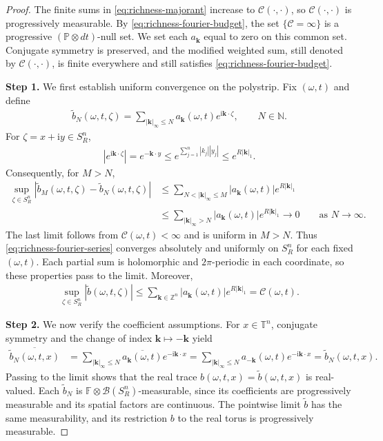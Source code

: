 \documentclass[print,wide]{draft}
\begin{document}
\begin{proof}
The finite sums in \eqref{eq:richness-majorant} increase to \(\mathcal C(\cdot,\cdot)\), so \(\mathcal C(\cdot,\cdot)\) is progressively measurable. By \eqref{eq:richness-fourier-budget}, the set \(\{\mathcal C=\infty\}\) is a progressive \((\mathbb P\otimes dt)\)-null set. We set each \(a_{\mathbf k}\) equal to zero on this common set. Conjugate symmetry is preserved, and the modified weighted sum, still denoted by \(\mathcal C(\cdot,\cdot)\), is finite everywhere and still satisfies \eqref{eq:richness-fourier-budget}.

\textbf{Step 1.} We first establish uniform convergence on the polystrip. Fix \((\omega,t)\) and define
\begin{align*}
\widetilde b_N(\omega,t,\zeta)
=\sum_{|\mathbf k|_\infty\le N}a_{\mathbf k}(\omega,t)e^{\mathrm{i}\mathbf k\cdot \zeta},
\qquad N\in\mathbb N.
\end{align*}
For \(\zeta=x+\mathrm{i}y\in S_R^n\),
\begin{align*}
|e^{\mathrm{i}\mathbf k\cdot \zeta}|
=e^{-\mathbf k\cdot y}
\le e^{\sum_{j=1}^n|k_j||y_j|}
\le e^{R|\mathbf k|_1}.
\end{align*}
Consequently, for \(M>N\),
\begin{align*}
\sup_{\zeta\in S_R^n}
|\widetilde b_M(\omega,t,\zeta)-\widetilde b_N(\omega,t,\zeta)|
&\le\sum_{N<|\mathbf k|_\infty\le M}
|a_{\mathbf k}(\omega,t)|e^{R|\mathbf k|_1}\\
&\le\sum_{|\mathbf k|_\infty>N}
|a_{\mathbf k}(\omega,t)|e^{R|\mathbf k|_1}
\to 0
\qquad\text{as }N\to\infty.
\end{align*}
The last limit follows from \(\mathcal C(\omega,t)<\infty\) and is uniform in \(M>N\). Thus \eqref{eq:richness-fourier-series} converges absolutely and uniformly on \(S_R^n\) for each fixed \((\omega,t)\). Each partial sum is holomorphic and \(2\pi\)-periodic in each coordinate, so these properties pass to the limit. Moreover,
\begin{align*}
\sup_{\zeta\in S_R^n}|\widetilde b(\omega,t,\zeta)|
\le\sum_{\mathbf k\in\mathbb Z^n}|a_{\mathbf k}(\omega,t)|e^{R|\mathbf k|_1}
=\mathcal C(\omega,t).
\end{align*}

\textbf{Step 2.} We now verify the coefficient assumptions. For \(x\in\mathbb T^n\), conjugate symmetry and the change of index \(\mathbf k\mapsto-\mathbf k\) yield
\begin{align*}
\overline{\widetilde b_N(\omega,t,x)}
&=\sum_{|\mathbf k|_\infty\le N}
\overline{a_{\mathbf k}(\omega,t)}e^{-\mathrm{i}\mathbf k\cdot x}
=\sum_{|\mathbf k|_\infty\le N}
a_{-\mathbf k}(\omega,t)e^{-\mathrm{i}\mathbf k\cdot x}
=\widetilde b_N(\omega,t,x).
\end{align*}
Passing to the limit shows that the real trace \(b(\omega,t,x)=\widetilde b(\omega,t,x)\) is real-valued. Each \(\widetilde b_N\) is \(\mathbb F\otimes\mathcal B(S_R^n)\)-measurable, since its coefficients are progressively measurable and its spatial factors are continuous. The pointwise limit \(\widetilde b\) has the same measurability, and its restriction \(b\) to the real torus is progressively measurable.


\end{proof}
\end{document}
